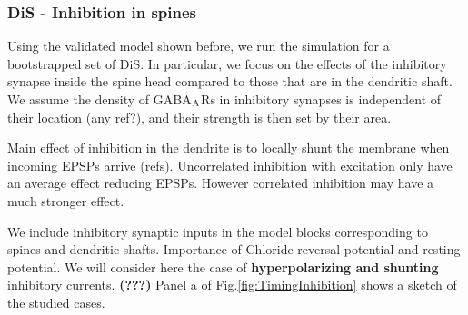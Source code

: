 \documentclass[10pt,letterpaper]{article}
\begin{document}
\subsubsection*{DiS - Inhibition in spines}

Using the validated model shown before, we run the simulation for a bootstrapped set of DiS. In particular, we focus on the effects of the inhibitory synapse inside the spine head compared to those that are in the dendritic shaft. We assume the density of GABA$_{\rm A}$Rs in inhibitory synapses is independent of their location (any ref?), and their strength is then set by their area. 

Main effect of inhibition in the dendrite is to locally shunt the membrane when incoming EPSPs arrive (refs). Uncorrelated inhibition with excitation only have an average effect reducing EPSPs. However correlated inhibition may have a much stronger effect.

 We include inhibitory synaptic inputs in the model blocks corresponding to spines and dendritic shafts. Importance of Chloride reversal potential and resting potential. We will consider here the case of \textbf{hyperpolarizing and shunting} inhibitory currents.\textbf{ (???)} Panel a of Fig.\ref{fig:TimingInhibition} shows a sketch of the studied cases. 
\end{document}
